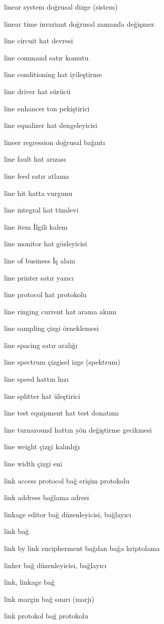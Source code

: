 \documentclass[12pt,fleqn]{article}\usepackage{../../common}
\begin{document}
linear system doğrusal dizge (sistem)

linear time invariant doğrusal zamanda değişmez

line circuit hat devresi

line command satır komutu

line conditioning hat iyileştirme

line driver hat sürücü

line enhancer ton pekiştirici

line equalizer hat dengeleyicisi

lineer regression doğrusal bağıntı

line fault hat arızası

line feed satır atlama

line hit hatta vurgunu

line integral hat tümlevi

line item İlgili kalem

line monitor hat gözleyicisi

line of business İş alanı

line printer satır yazıcı

line protocol hat protokolu

line ringing current hat arama akımı

line sampling çizgi örneklemesi

line spacing satır aralığı

line spectrum çizgisel izge (spektrum)

line speed hattın hızı

line splitter hat üleştirici

line test equipment hat test donatımı

line turnaround hattın yön değiştirme gecikmesi

line weight çizgi kalınlığı

line width çizgi eni

link access protocol bağ erişim protokolu

link address bağlama adresi

linkage editor bağ düzenleyicisi, bağlayıcı

link bağ

link by link encipherment bağdan bağa kriptolama

linker bağ düzenleyicisi, bağlayıcı

link, linkage bağ

link margin bağ sınırı (marjı)

link protokol bağ protokolu
\end{document}
